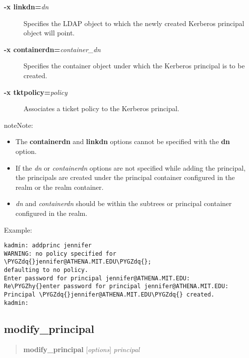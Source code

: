 \documentclass[letterpaper,10pt,english]{sphinxmanual}
\def\PYGZhy{\char`\-}
\def\PYGZdq{\char`\"}
\begin{document}
\begin{description}
\begin{description}
\item[{\textbf{-x linkdn=}\emph{dn}}] \leavevmode
Specifies the LDAP object to which the newly created Kerberos
principal object will point.

\item[{\textbf{-x containerdn=}\emph{container\_dn}}] \leavevmode
Specifies the container object under which the Kerberos
principal is to be created.

\item[{\textbf{-x tktpolicy=}\emph{policy}}] \leavevmode
Associates a ticket policy to the Kerberos principal.

\end{description}

\begin{notice}{note}{Note:}\begin{itemize}
\item {} 
The \textbf{containerdn} and \textbf{linkdn} options cannot be
specified with the \textbf{dn} option.

\item {} 
If the \emph{dn} or \emph{containerdn} options are not specified while
adding the principal, the principals are created under the
principal container configured in the realm or the realm
container.

\item {} 
\emph{dn} and \emph{containerdn} should be within the subtrees or
principal container configured in the realm.

\end{itemize}
\end{notice}

\end{description}

Example:

\begin{Verbatim}[commandchars=\\\{\}]
kadmin: addprinc jennifer
WARNING: no policy specified for \PYGZdq{}jennifer@ATHENA.MIT.EDU\PYGZdq{};
defaulting to no policy.
Enter password for principal jennifer@ATHENA.MIT.EDU:
Re\PYGZhy{}enter password for principal jennifer@ATHENA.MIT.EDU:
Principal \PYGZdq{}jennifer@ATHENA.MIT.EDU\PYGZdq{} created.
kadmin:
\end{Verbatim}


\subsection{modify\_principal}
\label{admin/database:modify-principal}\begin{quote}

\textbf{modify\_principal} {[}\emph{options}{]} \emph{principal}
\end{quote}
\end{document}
